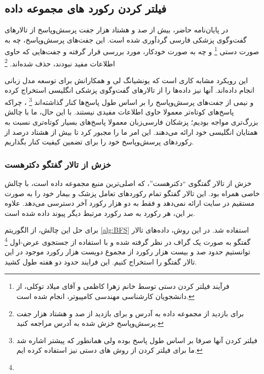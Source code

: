 \subsection{
	فیلتر کردن رکورد های مجموعه داده
}
در پایان‌نامه حاضر، بیش از صد و هشتاد هزار جفت پرسش‌وپاسخ از تالارهای گفت‌وگوی پزشکی فارسی گردآوری شده است. این جفت‌های پرسش‌وپاسخ، چه به صورت دستی
\footnote{
	فرآیند فیلتر کردن دستی توسط خانم زهرا کاظمی و آقای میلاد توکلی، از دانشجویان کارشناسی مهندسی کامپیوتر، انجام شده است.
}
و چه به صورت خودکار، مورد بررسی قرار گرفته و جفت‌هایی که حاوی اطلاعات مفید نبودند، حذف شده‌اند.
\footnote{
	برای بازدید از مجموعه داده 
	به آدرس
	و برای بازدید از صد و هشتاد هزار جفت پرسش‌وپاسخ خزش شده به آدرس
	مراجعه کنید.
}

این رویکرد مشابه کاری است که یونشیانگ لی و همکارانش برای توسعه مدل زبانی
انجام داده‌اند.
\cite{b40}
آنها نیز داده‌ها را از تالارهای گفت‌وگوی پزشکی انگلیسی استخراج کرده و نیمی از جفت‌های پرسش‌وپاسخ را بر اساس طول پاسخ‌ها کنار گذاشته‌اند
\footnote{
	فیلتر کردن آنها صرفا بر اساس طول پاسخ بوده ولی همانطور که پیشتر اشاره شد ما برای فیلتر کردن از روش های دستی نیز استفاده کرده ایم.
}
، 
چراکه پاسخ‌های کوتاه‌تر معمولا حاوی اطلاعات مفیدی نیستند. با این حال، ما با چالش بزرگ‌تری مواجه بودیم؛ پزشکان فارسی‌زبان معمولا پاسخ‌های بسیار کوتاه‌تری نسبت به همتایان انگلیسی خود ارائه می‌دهند. این امر ما را مجبور کرد تا بیش از هشتاد درصد از رکوردهای پرسش‌وپاسخ خود را برای تضمین کیفیت کنار بگذاریم.

\subsubsection{
	خزش از تالار گفتگو دکترهست
}
خزش از تالار گفتگوی “دکترهست”، که اصلی‌ترین منبع مجموعه داده
است، با چالش خاصی همراه بود. این تالار گفتگو تمام رکوردهای تعامل پزشک و بیمار خود را به صورت مستقیم در سایت ارائه نمی‌دهد و فقط به دو هزار رکورد آخر دسترسی می‌دهد. علاوه بر این، هر رکورد به صد رکورد مرتبط دیگر پیوند داده شده است.

برای حل این چالش، از الگوریتم
\ref{alg:BFS}
استفاده شد. در این روش، داده‌های تالار گفتگو به صورت یک گراف در نظر گرفته شده و با استفاده از جستجوی عرض-اول 
\footnote{}
توانستیم حدود صد و بیست هزار رکورد از مجموع دویست هزار رکورد موجود در این تالار گفتگو را استخراج کنیم. این فرایند حدود دو هفته طول کشید.

